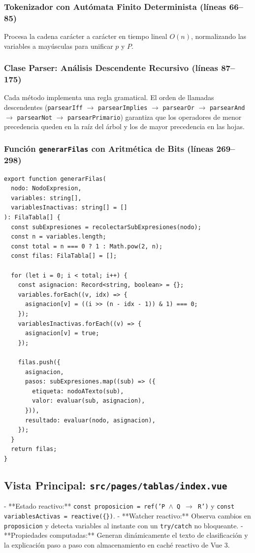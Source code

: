\documentclass[11pt,a4paper]{article}
\begin{document}
\subsubsection{Tokenizador con Autómata Finito Determinista (líneas 66--85)}
Procesa la cadena carácter a carácter en tiempo lineal $O(n)$, normalizando las variables a mayúsculas para unificar $p$ y $P$.

\subsubsection{Clase Parser: Análisis Descendente Recursivo (líneas 87--175)}
Cada método implementa una regla gramatical. El orden de llamadas descendentes (\texttt{parsearIff} $\to$ \texttt{parsearImplies} $\to$ \texttt{parsearOr} $\to$ \texttt{parsearAnd} $\to$ \texttt{parsearNot} $\to$ \texttt{parsearPrimario}) garantiza que los operadores de menor precedencia queden en la raíz del árbol y los de mayor precedencia en las hojas.

\subsubsection{Función \texttt{generarFilas} con Aritmética de Bits (líneas 269--298)}
\begin{lstlisting}[caption={Generación matricial mediante desplazamiento y máscara de bits.}]
export function generarFilas(
  nodo: NodoExpresion,
  variables: string[],
  variablesInactivas: string[] = []
): FilaTabla[] {
  const subExpresiones = recolectarSubExpresiones(nodo);
  const n = variables.length;
  const total = n === 0 ? 1 : Math.pow(2, n);
  const filas: FilaTabla[] = [];

  for (let i = 0; i < total; i++) {
    const asignacion: Record<string, boolean> = {};
    variables.forEach((v, idx) => {
      asignacion[v] = ((i >> (n - idx - 1)) & 1) === 0;
    });
    variablesInactivas.forEach((v) => {
      asignacion[v] = true;
    });

    filas.push({
      asignacion,
      pasos: subExpresiones.map((sub) => ({
        etiqueta: nodoATexto(sub),
        valor: evaluar(sub, asignacion),
      })),
      resultado: evaluar(nodo, asignacion),
    });
  }
  return filas;
}
\end{lstlisting}

\subsection{Vista Principal: \texttt{src/pages/tablas/index.vue}}
- **Estado reactivo:** \texttt{const proposicion = ref('P $\land$ Q $\to$ R')} y \texttt{const variablesActivas = reactive(\{\})}.
- **Watcher reactivo:** Observa cambios en \texttt{proposicion} y detecta variables al instante con un \texttt{try/catch} no bloqueante.
- **Propiedades computadas:** Generan dinámicamente el texto de clasificación y la explicación paso a paso con almacenamiento en caché reactivo de Vue 3.
\end{document}
